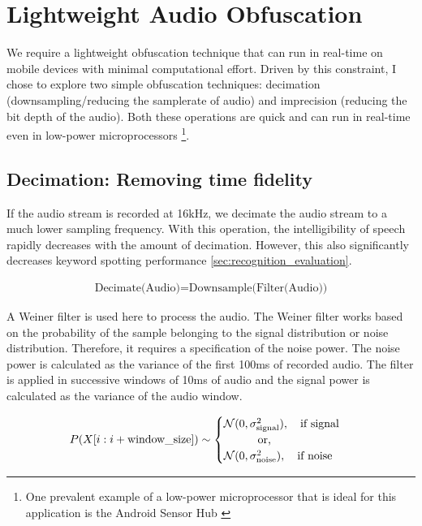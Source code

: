 
\section{Lightweight Audio Obfuscation}
\label{sec:obfuscation}

We require a lightweight obfuscation technique that can run in real-time on mobile devices with minimal computational effort.
 Driven by this constraint, I chose to explore two simple obfuscation techniques: decimation (downsampling/reducing the samplerate of audio) and imprecision (reducing the bit depth of the audio).
 Both these operations are quick and can run in real-time even in low-power microprocessors \footnote{One prevalent example of a low-power microprocessor that is ideal for this application is the Android Sensor Hub \cite{AndroidSensorHub}}.

\subsection{Decimation: Removing time fidelity}

If the audio stream is recorded at 16kHz, we decimate the audio stream to a much lower sampling frequency.
 With this operation, the intelligibility of speech rapidly decreases with the amount of decimation.
 However, this also significantly decreases keyword spotting performance \ref{sec:recognition_evaluation}.

\begin{gather}
\text{Decimate(Audio)} = \text{Downsample(Filter(Audio))}
\end{gather}

A Weiner filter is used here to process the audio.
 The Weiner filter works based on the probability of the sample belonging to the signal distribution or noise distribution.
 Therefore, it requires a specification of the noise power.
 The noise power is calculated as the variance of the first 100ms of recorded audio.
 The filter is applied in successive windows of 10ms of audio and the signal power is calculated as the variance of the audio window.

\begin{gather}
P(X[i:i+\text{window\_size}]) \sim \begin{cases}
  \mathcal{N}(0, \sigma_{\text{signal}}^2), \quad \mbox{if signal} \\
  \quad\quad\quad \text{\centering or,} \\
  \mathcal{N}(0, \sigma_{\text{noise}}^2), \quad \mbox{if noise}
 \end{cases}
\end{gather}

